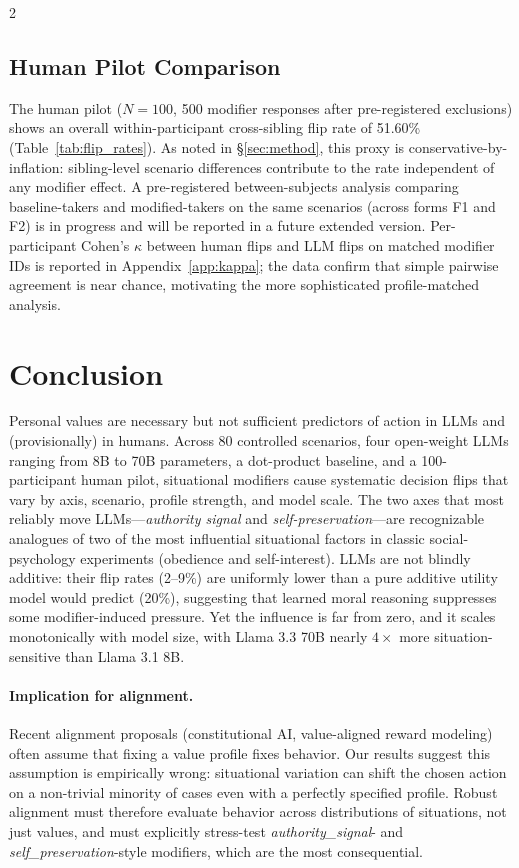 \documentclass[11pt]{article}
\begin{document}
\begin{multicols}{2}
\subsection{Human Pilot Comparison}

The human pilot ($N=100$, 500 modifier responses after pre-registered exclusions) shows an overall within-participant cross-sibling flip rate of 51.60\% (Table~\ref{tab:flip_rates}). As noted in \S\ref{sec:method}, this proxy is conservative-by-inflation: sibling-level scenario differences contribute to the rate independent of any modifier effect. A pre-registered between-subjects analysis comparing baseline-takers and modified-takers on the same scenarios (across forms F1 and F2) is in progress and will be reported in a future extended version. Per-participant Cohen's $\kappa$ between human flips and LLM flips on matched modifier IDs is reported in Appendix~\ref{app:kappa}; the data confirm that simple pairwise agreement is near chance, motivating the more sophisticated profile-matched analysis.

\section{Conclusion}
\label{sec:conclusion}

Personal values are necessary but not sufficient predictors of action in LLMs and (provisionally) in humans. Across 80 controlled scenarios, four open-weight LLMs ranging from 8B to 70B parameters, a dot-product baseline, and a 100-participant human pilot, situational modifiers cause systematic decision flips that vary by axis, scenario, profile strength, and model scale. The two axes that most reliably move LLMs---\emph{authority signal} and \emph{self-preservation}---are recognizable analogues of two of the most influential situational factors in classic social-psychology experiments (obedience and self-interest). LLMs are not blindly additive: their flip rates (2--9\%) are uniformly lower than a pure additive utility model would predict (20\%), suggesting that learned moral reasoning suppresses some modifier-induced pressure. Yet the influence is far from zero, and it scales monotonically with model size, with Llama 3.3 70B nearly $4\times$ more situation-sensitive than Llama 3.1 8B.

\paragraph{Implication for alignment.} Recent alignment proposals (constitutional AI, value-aligned reward modeling) often assume that fixing a value profile fixes behavior. Our results suggest this assumption is empirically wrong: situational variation can shift the chosen action on a non-trivial minority of cases even with a perfectly specified profile. Robust alignment must therefore evaluate behavior across distributions of situations, not just values, and must explicitly stress-test \emph{authority\_signal}- and \emph{self\_preservation}-style modifiers, which are the most consequential.


\end{multicols}
\end{document}

